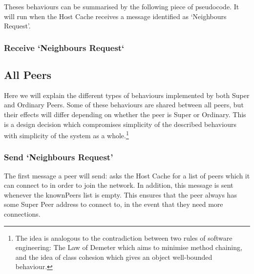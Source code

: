 Theses behaviours can be summarised by the following piece of pseudocode. It
will run when the Host Cache receives a message identified as `Neighbours
Request'.

\subsubsection{Receive `Neighbours Request`}

\begin{algorithm}[H]

  \;
\end{algorithm}

\subsection{All Peers}

Here we will explain the different types of behaviours implemented by both Super
and Ordinary Peers. Some of these behaviours are shared between all peers, but
their effects will differ depending on whether the peer is Super or Ordinary.
This is a design decision which compromises simplicity of the described
behaviours with simplicity of the system as a whole.\footnote{The idea is
analogous to the contradiction between two rules of software engineering: The
Law of Demeter which aims to minimise method chaining, and the idea of class
cohesion which gives an object well-bounded behaviour.}

\subsubsection{Send `Neighbours Request'}

The first message a peer will send: asks the Host Cache for a list of peers
which it can connect to in order to join the network. In addition, this message
is sent whenever the knownPeers list is empty.  This ensures that the peer
always has some Super Peer address to connect to, in the event that they need
more connections.

